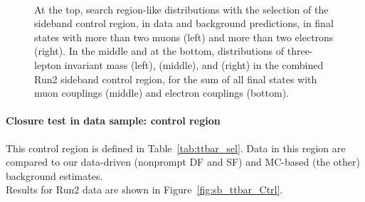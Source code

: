 \begin{figure}[h]
\noindent
  \\
  \caption{At the top, search region-like distributions with the selection of the
    sideband control region, in data and background
    predictions, in final states with more than two muons (left) and
    more than two electrons (right). In the middle and at the bottom, distributions of three-lepton invariant mass (left), \mtwol
    (middle), and \Deltwod (right) in the combined Run2 sideband control region,
    for the sum of all final states with muon couplings (middle) and
    electron couplings (bottom).}
  \label{fig:sb_sr_Ctrl}
\end{figure}
\vspace{10cm}
\paragraph*{Closure test in data sample: \PQb control region}
This control region is defined in Table~\ref{tab:ttbar_sel}.
Data in this region are compared to our data-driven (nonprompt DF and
SF) and MC-based (the other) background estimates.\\
Results for Run2 data  are shown in
Figure~\ref{fig:sb_ttbar_Ctrl}.

